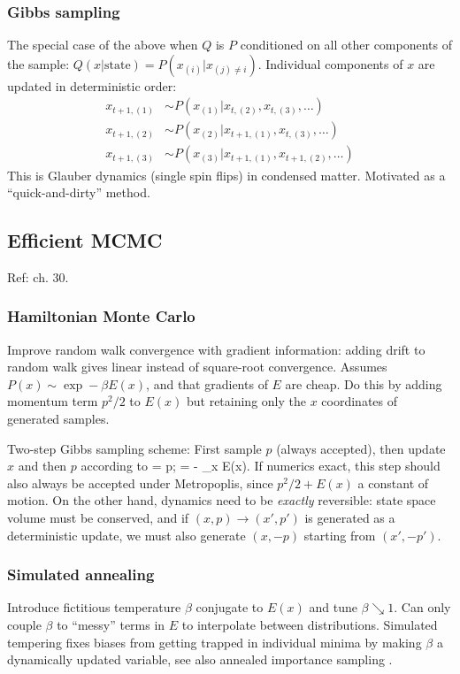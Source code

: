 \documentclass[notitlepage,openany,11pt]{report}
\theoremstyle{plain}%
\numberwithin{equation}{section}
\begin{document}
\subsubsection{Gibbs sampling} The special case of the above when $Q$ is $P$ conditioned on all other components of the sample: $Q(x | \text{state}) = P(x_{(i)} | x_{(j) \neq i})$. Individual components of $x$ are updated in deterministic order:
\begin{align*}
x_{t+1, (1)} &\sim P(x_{(1)} | x_{t, (2)}, x_{t, (3)}, \ldots) \\
x_{t+1, (2)} &\sim P(x_{(2)} | x_{t+1, (1)}, x_{t, (3)}, \ldots) \\
x_{t+1, (3)} &\sim P(x_{(3)} | x_{t+1, (1)}, x_{t+1, (2)}, \ldots)
\end{align*}
This is Glauber dynamics (single spin flips) in condensed matter. Motivated as a ``quick-and-dirty'' method.

\subsection{Efficient MCMC} Ref: \cite{MacKay:03} ch. 30.

\subsubsection{Hamiltonian Monte Carlo} Improve random walk convergence with gradient information: adding drift to random walk gives linear instead of square-root convergence. Assumes $P(x) \sim \exp -\beta E(x)$, and that gradients of $E$ are cheap. Do this by adding momentum term $p^{2}/2$ to $E(x)$ but retaining only the $x$ coordinates of generated samples. 

Two-step Gibbs sampling scheme: First sample $p$ (always accepted), then update $x$ and then $p$ according to
\be
{} = p; \qquad {} = - \partial_{x} E(x).
\ee
If numerics exact, this step should also always be accepted under Metropoplis, since $p^{2}/2 + E(x)$ a constant of motion.  On the other hand, dynamics need to be \textit{exactly} reversible: state space volume must be conserved, and if $(x,p) \to (x',p')$ is generated as a deterministic update, we must also generate $(x, -p)$ starting from $(x', -p')$.

\subsubsection{Simulated annealing} Introduce fictitious temperature $\beta$ conjugate to $E(x)$ and tune $\beta \searrow 1$. Can only couple $\beta$ to ``messy'' terms in $E$ to interpolate between distributions. Simulated tempering \cite{MarinariParisi:92} fixes biases from getting trapped in individual minima by making $\beta$ a dynamically updated variable, see also annealed importance sampling \cite{Neal:01}.
\end{document}
